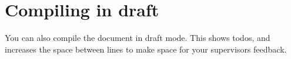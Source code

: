 
\section{Compiling in draft}\label{sec:compiling-in-draft}
You can also compile the document in draft mode.
This shows todos, and increases the space between lines to make space for your supervisors feedback.

